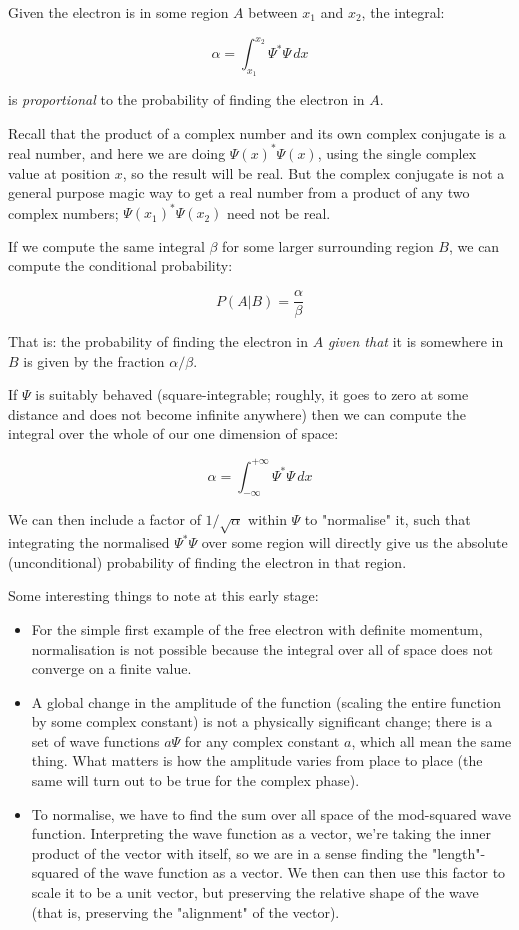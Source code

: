 Given the electron is in some region $A$ between $x_1$ and $x_2$, the integral:

$$
\alpha =
\int_{x_1}^{x_2}
\Psi^*\Psi
\,dx
$$

is \textit{proportional} to the probability of finding the electron in $A$.

Recall that the product of a complex number and its own complex conjugate is a real number, and here we are doing $\Psi(x)^*\Psi(x)$, using the single complex value at position $x$, so the result will be real. But the complex conjugate is not a general purpose magic way to get a real number from a product of any two complex numbers; $\Psi(x_1)^*\Psi(x_2)$ need not be real.

If we compute the same integral $\beta$ for some larger surrounding region $B$, we can compute the conditional probability:

$$
P(A|B) = \frac{\alpha}{\beta}
$$

That is: the probability of finding the electron in $A$ \textit{given that} it is somewhere in $B$ is given by the fraction $\alpha / \beta$.

If $\Psi$ is suitably behaved (square-integrable; roughly, it goes to zero at some distance and does not become infinite anywhere) then we can compute the integral over the whole of our one dimension of space:

$$
\alpha =
\int_{-\infty}^{+\infty}
\Psi^*\Psi
\,dx
$$

We can then include a factor of $1/\sqrt{\alpha}$ within $\Psi$ to "normalise" it, such that integrating the normalised $\Psi^*\Psi$ over some region will directly give us the absolute (unconditional) probability of finding the electron in that region.

Some interesting things to note at this early stage:

\begin{itemize}
  \item For the simple first example of the free electron with definite momentum, normalisation is not possible because the integral over all of space does not converge on a finite value.
  \item A global change in the amplitude of the function (scaling the entire function by some complex constant) is not a physically significant change; there is a set of wave functions $a\Psi$ for any complex constant $a$, which all mean the same thing. What matters is how the amplitude varies from place to place (the same will turn out to be true for the complex phase).
  \item To normalise, we have to find the sum over all space of the mod-squared wave function. Interpreting the wave function as a vector, we're taking the inner product of the vector with itself, so we are in a sense finding the "length"-squared of the wave function as a vector. We then can then use this factor to scale it to be a unit vector, but preserving the relative shape of the wave (that is, preserving the "alignment" of the vector).
\end{itemize}


